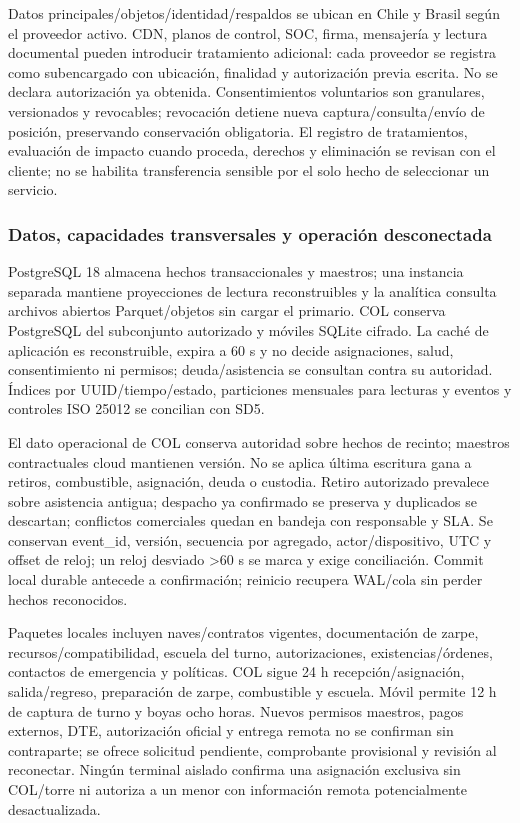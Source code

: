 \documentclass[11pt,letterpaper]{report}
\begin{document}
Datos principales/objetos/identidad/respaldos se ubican en Chile y Brasil según el proveedor activo. CDN, planos de control, SOC, firma, mensajería y lectura documental pueden introducir tratamiento adicional: cada proveedor se registra como subencargado con ubicación, finalidad y autorización previa escrita. No se declara autorización ya obtenida. Consentimientos voluntarios son granulares, versionados y revocables; revocación detiene nueva captura/consulta/envío de posición, preservando conservación obligatoria. El registro de tratamientos, evaluación de impacto cuando proceda, derechos y eliminación se revisan con el cliente; no se habilita transferencia sensible por el solo hecho de seleccionar un servicio.

\subsubsection*{Datos, capacidades transversales y operación desconectada}
PostgreSQL 18 almacena hechos transaccionales y maestros; una instancia separada mantiene proyecciones de lectura reconstruibles y la analítica consulta archivos abiertos Parquet/objetos sin cargar el primario. COL conserva PostgreSQL del subconjunto autorizado y móviles SQLite cifrado. La caché de aplicación es reconstruible, expira a 60 s y no decide asignaciones, salud, consentimiento ni permisos; deuda/asistencia se consultan contra su autoridad. Índices por UUID/tiempo/estado, particiones mensuales para lecturas y eventos y controles ISO 25012 se concilian con SD5.

El dato operacional de COL conserva autoridad sobre hechos de recinto; maestros contractuales cloud mantienen versión. No se aplica última escritura gana a retiros, combustible, asignación, deuda o custodia. Retiro autorizado prevalece sobre asistencia antigua; despacho ya confirmado se preserva y duplicados se descartan; conflictos comerciales quedan en bandeja con responsable y SLA. Se conservan event\_id, versión, secuencia por agregado, actor/dispositivo, UTC y offset de reloj; un reloj desviado >60 s se marca y exige conciliación. Commit local durable antecede a confirmación; reinicio recupera WAL/cola sin perder hechos reconocidos.

Paquetes locales incluyen naves/contratos vigentes, documentación de zarpe, recursos/compatibilidad, escuela del turno, autorizaciones, existencias/órdenes, contactos de emergencia y políticas. COL sigue 24 h recepción/asignación, salida/regreso, preparación de zarpe, combustible y escuela. Móvil permite 12 h de captura de turno y boyas ocho horas. Nuevos permisos maestros, pagos externos, DTE, autorización oficial y entrega remota no se confirman sin contraparte; se ofrece solicitud pendiente, comprobante provisional y revisión al reconectar. Ningún terminal aislado confirma una asignación exclusiva sin COL/torre ni autoriza a un menor con información remota potencialmente desactualizada.
\end{document}
